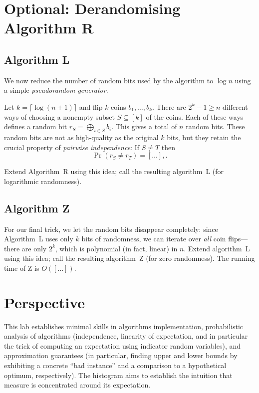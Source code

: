 \documentclass{tufte-handout}
\begin{document}
\newpage
\section{Optional: Derandomising Algorithm R}

\subsection{Algorithm L} 


We now reduce the number of random bits used by the algorithm to $\log
n$ using a simple \emph{pseudorandom generator}.


Let $k=\lceil\log (n+1)\rceil$ and flip $k$ coins $b_1,\ldots, b_k$.
There are $2^k -1 \geq n$ different ways of choosing a nonempty subset
$S\subseteq [k]$ of the coins.
Each of these ways defines a random bit $r_S =\bigoplus_{i\in S} b_i$.
This gives a total of $n$ random bits.
These random bits are not as high-quality as the original $k$ bits,
but they retain the crucial property of \emph{pairwise independence}:
If $S\neq T$ then 
\[ \Pr(r_S\neq r_T) = [\ldots],.\]

Extend Algorithm~R using this idea; call the resulting
algorithm~L (for logarithmic randomness).

\subsection{Algorithm Z}

For our final trick, we let the random bits disappear completely:
since Algorithm~L uses only $k$ bits of randomness, we can iterate
over \emph{all} coin flips---there are only $2^k$, which is polynomial
(in fact, linear) in $n$.
Extend algorithm~L using this idea; call the resulting algorithm~Z
(for zero randomness).
The running time of Z is $O([\ldots])$.

\newpage
\section{Perspective}

This lab establishes minimal skills in algorithms implementation,
probabilistic analysis of algorithms (independence, linearity of
expectation, and in particular the trick of computing an expectation
using indicator random variables), and approximation guarantees (in
particular, finding upper and lower bounds by exhibiting a concrete
``bad instance'' and a comparison to a hypothetical optimum,
respectively).
The histogram aims to establish the intuition that measure is
concentrated around its expectation.
\end{document}
